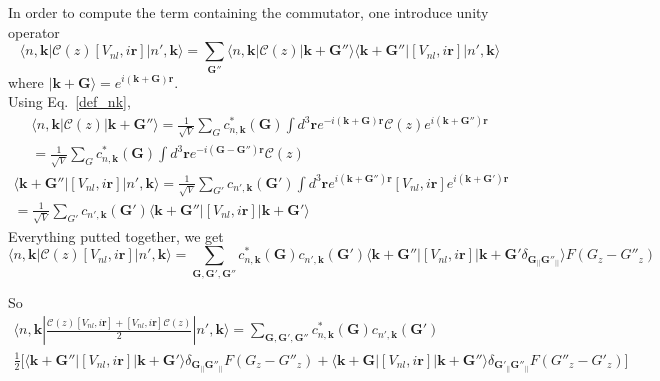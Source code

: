 \documentclass[a4paper,11pt]{report}
\renewcommand{\vec}[1]{\mathbf{#1}}
\newcommand{\bra}{\langle}
\newcommand{\ket}{\rangle}
\begin{document}
In order to compute the term containing the commutator, one introduce
unity operator
\begin{equation}
  \bra n,\vec{k}|\mathcal{C}(z)[V_{nl},i\vec{r}]|n',\vec{k}\ket =
\sum_{\vec{G''}}\bra
n,\vec{k}|\mathcal{C}(z)|\vec{k}+\vec{G''}\ket\bra\vec{k}+\vec{G''}|
[V_{nl},i\vec{r}]|n',\vec{k}\ket
\end{equation}
where $|\vec{k}+\vec{G}\ket = e^{i(\vec{k}+\vec{G})\vec{r}}$.\\
Using Eq.~\ref{def_nk},
\begin{eqnarray}
  \bra n,\vec{k}|\mathcal{C}(z)|\vec{k}+\vec{G''}\ket =
\frac{1}{\sqrt{V}} \sum_{G} c^*_{n,\vec{k}}(\vec{G}) \int d^3\vec{r}
e^{-i(\vec{k}+\vec{G})\vec{r}}
\mathcal{C}(z)e^{i(\vec{k}+\vec{G''})\vec{r}}\nonumber\\
= \frac{1}{\sqrt{V}} \sum_{G} c^*_{n,\vec{k}}(\vec{G})\int d^3\vec{r}
e^{-i(\vec{G}-\vec{G''})\vec{r}} \mathcal{C}(z)
\end{eqnarray}
\begin{eqnarray}
  \bra\vec{k}+\vec{G''}| [V_{nl},i\vec{r}]|n',\vec{k}\ket =
\frac{1}{\sqrt{V}} \sum_{G'} c_{n',\vec{k}}(\vec{G'})\int d^3\vec{r}
e^{i(\vec{k}+\vec{G''})\vec{r}} [V_{nl},i\vec{r}]
e^{i(\vec{k}+\vec{G'})\vec{r}} \nonumber\\
= \frac{1}{\sqrt{V}} \sum_{G'} c_{n',\vec{k}}(\vec{G'}) \bra
\vec{k}+\vec{G''}| [V_{nl},i\vec{r}]|\vec{k}+\vec{G'}\ket
\end{eqnarray}
Everything putted together, we get
\begin{equation}
  \bra n,\vec{k}|\mathcal{C}(z)[V_{nl},i\vec{r}]|n',\vec{k}\ket =
\sum_{\vec{G},\vec{G'},\vec{G''}}
c^*_{n,\vec{k}}(\vec{G})c_{n',\vec{k}}(\vec{G'}) \bra \vec{k}+\vec{G''}|
[V_{nl},i\vec{r}]|\vec{k}+\vec{G'}\delta_{\vec{G}_{||}\vec{G''}_{||}}
\ket F(G_z-G''_z)
\end{equation}

So
\begin{eqnarray}
  \bra
n,\vec{k}|\frac{\mathcal{C}(z)[V_{nl},i\vec{r}]+[V_{nl},i\vec{r}]\mathcal{C}(z)}{2}|n',\vec{k}\ket
= \sum_{\vec{G},\vec{G'},\vec{G''}}
c^*_{n,\vec{k}}(\vec{G})c_{n',\vec{k}}(\vec{G'})\nonumber\\
\frac{1}{2}\Bigg[ \bra \vec{k}+\vec{G''}|
[V_{nl},i\vec{r}]|\vec{k}+\vec{G'}\ket\delta_{\vec{G}_{||}\vec{G''}_{||}} F(G_z-G''_z)
+ \bra \vec{k}+\vec{G}| [V_{nl},i\vec{r}]|\vec{k}+\vec{G''}
\ket\delta_{\vec{G'}_{||}\vec{G''}_{||}} F(G''_z-G'_z) \Bigg]
\end{eqnarray}
\end{document}
